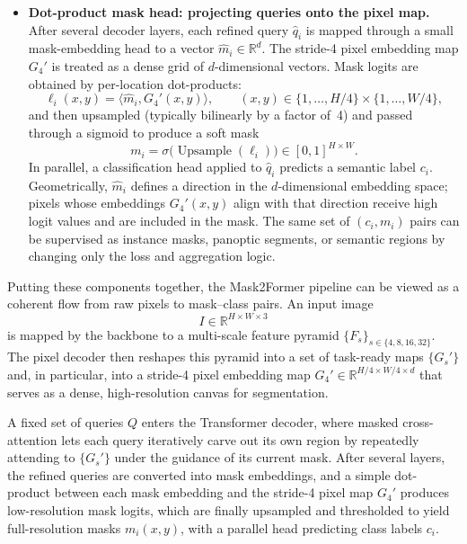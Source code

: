 \begin{enrichment}
\begin{enrichment}
\begin{itemize}
			\item \textbf{Dot-product mask head: projecting queries onto the pixel map.} After several decoder layers, each refined query $\hat q_i$ is mapped through a small mask-embedding head to a vector $\hat m_i \in \mathbb{R}^d$. The stride-4 pixel embedding map $G_4'$ is treated as a dense grid of $d$-dimensional vectors. Mask logits are obtained by per-location dot-products:
			\[
			\ell_i(x,y) = \langle \hat m_i, G_4'(x,y) \rangle, \qquad (x,y) \in \{1,\dots,H/4\} \times \{1,\dots,W/4\},
			\]
			and then upsampled (typically bilinearly by a factor of~4) and passed through a sigmoid to produce a soft mask
			\[
			m_i = \sigma\bigl(\operatorname{Upsample}(\ell_i)\bigr) \in [0,1]^{H \times W}.
			\]
			In parallel, a classification head applied to $\hat q_i$ predicts a semantic label $c_i$. Geometrically, $\hat m_i$ defines a direction in the $d$-dimensional embedding space; pixels whose embeddings $G_4'(x,y)$ align with that direction receive high logit values and are included in the mask. The same set of $(c_i, m_i)$ pairs can be supervised as instance masks, panoptic segments, or semantic regions by changing only the loss and aggregation logic.
		\end{itemize}
		
		\medskip \noindent
	 	Putting these components together, the Mask2Former pipeline can be viewed as a coherent flow from raw pixels to mask--class pairs. An input image
	 	\[
	 	I \in \mathbb{R}^{H \times W \times 3}
	 	\]
	 	is mapped by the backbone to a multi-scale feature pyramid $\{F_s\}_{s \in \{4,8,16,32\}}$. The pixel decoder then reshapes this pyramid into a set of task-ready maps $\{G_s'\}$ and, in particular, into a stride-4 pixel embedding map $G_4' \in \mathbb{R}^{H/4 \times W/4 \times d}$ that serves as a dense, high-resolution canvas for segmentation.
	 	
	 	\newpage
	 	
	 	A fixed set of queries $Q$ enters the Transformer decoder, where masked cross-attention lets each query iteratively carve out its own region by repeatedly attending to $\{G_s'\}$ under the guidance of its current mask. After several layers, the refined queries are converted into mask embeddings, and a simple dot-product between each mask embedding and the stride-4 pixel map $G_4'$ produces low-resolution mask logits, which are finally upsampled and thresholded to yield full-resolution masks $m_i(x,y)$, with a parallel head predicting class labels $c_i$.
	 	

\end{enrichment}
\end{enrichment}
